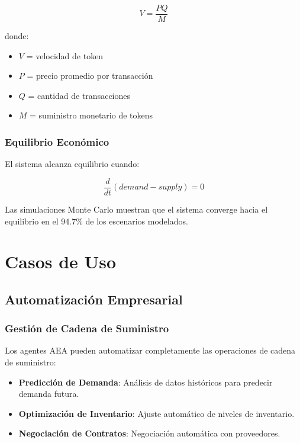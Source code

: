 \documentclass[12pt,a4paper]{article}
\begin{document}
\begin{equation}
V = \frac{PQ}{M}
\end{equation}

donde:
\begin{itemize}
\item $V$ = velocidad de token
\item $P$ = precio promedio por transacción
\item $Q$ = cantidad de transacciones
\item $M$ = suministro monetario de tokens
\end{itemize}

\subsubsection{Equilibrio Económico}

El sistema alcanza equilibrio cuando:

\begin{equation}
\frac{d}{dt}(demand - supply) = 0
\end{equation}

Las simulaciones Monte Carlo muestran que el sistema converge hacia el equilibrio en el 94.7\% de los escenarios modelados.

\section{Casos de Uso}

\subsection{Automatización Empresarial}

\subsubsection{Gestión de Cadena de Suministro}

Los agentes AEA pueden automatizar completamente las operaciones de cadena de suministro:

\begin{itemize}
\item \textbf{Predicción de Demanda}: Análisis de datos históricos para predecir demanda futura.
\item \textbf{Optimización de Inventario}: Ajuste automático de niveles de inventario.
\item \textbf{Negociación de Contratos}: Negociación automática con proveedores.
\end{itemize}
\end{document}
